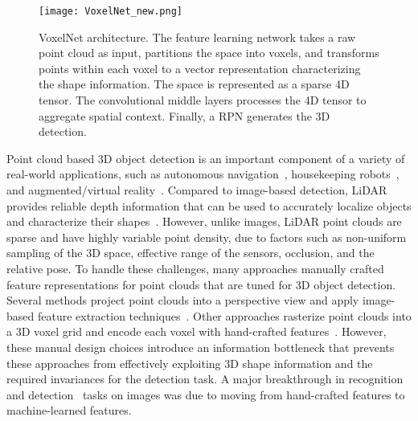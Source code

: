 \documentclass[10pt,twocolumn,letterpaper]{article}
\begin{document}
\begin{figure*}[!th]
\centering
    \texttt{[image: VoxelNet\_new.png]}
    \vspace{-0.1cm}
\caption{VoxelNet architecture. The feature learning network takes a raw point cloud as input, partitions the space into voxels, and transforms points within each voxel to a vector representation characterizing the shape information. The space is represented as a sparse 4D tensor. The convolutional middle layers processes the 4D tensor to aggregate spatial context. Finally, a RPN generates the 3D detection.}
\label{fig:VoxelNet_flowchart}
\end{figure*}

Point cloud based 3D object detection is an important component of a variety of real-world applications, such as autonomous navigation~\cite{REF:Geiger2012CVPR,REF:Drone}, housekeeping robots~\cite{REF:Housekeeping}, and augmented/virtual reality~\cite{REF:AR}. Compared to image-based detection, LiDAR provides reliable depth information that can be used to accurately localize objects and characterize their shapes~\cite{REF:3DFCN, REF:cvpr17chen}. However, unlike images,  LiDAR point clouds are sparse and have highly variable point density, due to factors such as non-uniform sampling of the 3D space, effective range of the sensors, occlusion, and the relative pose. To handle these challenges, many approaches manually crafted feature representations for point clouds that are tuned for 3D object detection. Several methods project point clouds into a perspective view and apply image-based feature extraction techniques~\cite{REF:FusionDPM-IROS14, REF:MV-RGBD-RF2015,REF:VeloFCN}. Other approaches rasterize point clouds into a 3D voxel grid and encode each voxel with hand-crafted features~\cite{REF:Wang-RSS-15,REF:Vote3Deep,REF:Song2014,REF:DeepSlidingShapes,REF:3DFCN,REF:cvpr17chen}. However, these manual design choices introduce an information bottleneck that prevents these approaches from effectively exploiting 3D shape information and the required invariances for the detection task.  A major breakthrough in recognition~\cite{REF:NIPS2012_4824} and detection~\cite{REF:girshick2014rich} tasks on images was due to moving from hand-crafted features to machine-learned features.
\end{document}
